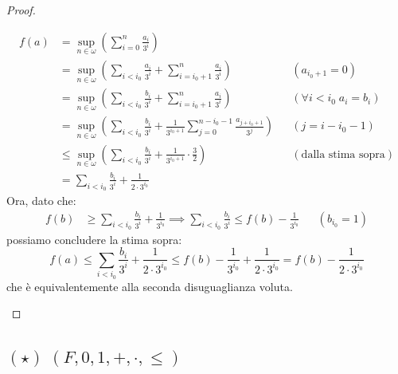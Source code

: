 \begin{proof}
\begin{itemize}
\begin{align*}
			f(a) &= \sup_{n \in \omega} \left(\sum_{i = 0}^n \frac{a_i}{3^i}\right) \\
				 &= \sup_{n \in \omega} \left(\sum_{i < i_0}\frac{a_i}{3^i} + \sum_{i = i_0 + 1}^n \frac{a_i}{3^i} \right) &&(a_{i_0 + 1} = 0) \\
				 &= \sup_{n \in \omega} \left(\sum_{i < i_0}\frac{b_i}{3^i} + \sum_{i = i_0 + 1}^n \frac{a_i}{3^i} \right) &&(\forall i < i_0 \; a_{i} = b_{i}) \\
				 &=\sup_{n \in \omega} \left(\sum_{i < i_0}\frac{b_i}{3^i} + \frac{1}{3^{i_0 + 1}}\sum_{j = 0}^{n - i_0 - 1} \frac{a_{j + i_0 + 1}}{3^j} \right) &&(j = i - i_0 - 1) \\
				 &\leq\sup_{n \in \omega} \left(\sum_{i < i_0}\frac{b_i}{3^i} + \frac{1}{3^{i_0 + 1}} \cdot \frac 32  \right) &&(\text{dalla stima sopra}) \\
				 &= \sum_{i < i_0}\frac{b_i}{3^i} + \frac{1}{2 \cdot 3^{i_0}}  
		\end{align*}
		Ora, dato che:
		\begin{align*}
			f(b) &\geq \sum_{i < i_0}\frac{b_i}{3^i} + \frac{1}{3^{i_0}} \implies \sum_{i < i_0}\frac{b_i}{3^i} \leq f(b) - \frac{1}{3^{i_0}} &&(b_{i_0} = 1)
		\end{align*}
		possiamo concludere la stima sopra:
		\[ f(a) \leq \sum_{i < i_0}\frac{b_i}{3^i} + \frac{1}{2 \cdot 3^{i_0}} \leq f(b) - \frac{1}{3^{i_0}} + \frac{1}{2 \cdot 3^{i_0}} = f(b) - \frac{1}{2 \cdot 3^{i_0}}
			\]
		che è equivalentemente alla seconda disuguaglianza voluta.
	\end{itemize}
\end{proof}

\subsection{\texorpdfstring{$(\star) \; (F,0,1,+,\cdot,\leq)$}{Unicità (a meno di isomorfismo) di un campo ordinato completo}}